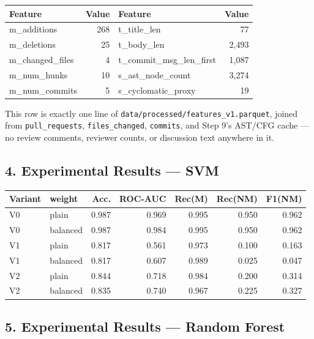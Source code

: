 \documentclass{experimentreport}
\begin{document}
{\begin{center}
\begin{tabular}{|l|r||l|r|}
\hline
\textbf{Feature} & \textbf{Value} & \textbf{Feature} & \textbf{Value} \\
\hline
m\_additions & 268 & t\_title\_len & 77 \\
m\_deletions & 25 & t\_body\_len & 2{,}493 \\
m\_changed\_files & 4 & t\_commit\_msg\_len\_first & 1{,}087 \\
m\_num\_hunks & 10 & s\_ast\_node\_count & 3{,}274 \\
m\_num\_commits & 5 & s\_cyclomatic\_proxy & 19 \\
\hline
\end{tabular}
\end{center}

This row is exactly one line of \texttt{data/processed/features\_v1.parquet}, joined from
\texttt{pull\_requests}, \texttt{files\_changed}, \texttt{commits}, and Step 9's AST/CFG cache ---
no review comments, reviewer counts, or discussion text anywhere in it.

\subsection*{4. Experimental Results --- SVM}

\begin{center}
\small
\begin{tabular}{|l|l|r|r|r|r|r|}
\hline
\textbf{Variant} & \textbf{weight} & \textbf{Acc.} & \textbf{ROC-AUC} & \textbf{Rec(M)} & \textbf{Rec(NM)} & \textbf{F1(NM)} \\
\hline
V0 & plain    & 0.987 & 0.969 & 0.995 & 0.950 & 0.962 \\
V0 & balanced & 0.987 & 0.984 & 0.995 & 0.950 & 0.962 \\
V1 & plain    & 0.817 & 0.561 & 0.973 & 0.100 & 0.163 \\
V1 & balanced & 0.817 & 0.607 & 0.989 & 0.025 & 0.047 \\
V2 & plain    & 0.844 & 0.718 & 0.984 & 0.200 & 0.314 \\
V2 & balanced & 0.835 & 0.740 & 0.967 & 0.225 & 0.327 \\
\hline
\end{tabular}
\end{center}

\subsection*{5. Experimental Results --- Random Forest}

}
\end{document}
